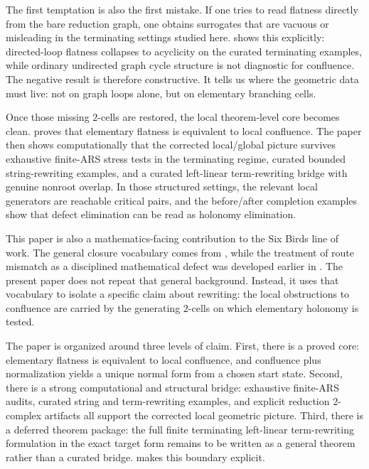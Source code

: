\documentclass[11pt]{article}
\numberwithin{equation}{section}
\theoremstyle{definition}
\theoremstyle{remark}
\begin{document}
The first temptation is also the first mistake. If one tries to read flatness directly from the bare reduction graph, one obtains surrogates that are vacuous or misleading in the terminating settings studied here.  shows this explicitly: directed-loop flatness collapses to acyclicity on the curated terminating examples, while ordinary undirected graph cycle structure is not diagnostic for confluence. The negative result is therefore constructive. It tells us where the geometric data must live: not on graph loops alone, but on elementary branching cells.

Once those missing $2$-cells are restored, the local theorem-level core becomes clean.  proves that elementary flatness is equivalent to local confluence. The paper then shows computationally that the corrected local/global picture survives exhaustive finite-ARS stress tests in the terminating regime, curated bounded string-rewriting examples, and a curated left-linear term-rewriting bridge with genuine nonroot overlap. In those structured settings, the relevant local generators are reachable critical pairs, and the before/after completion examples show that defect elimination can be read as holonomy elimination.

This paper is also a mathematics-facing contribution to the Six Birds line of work. The general closure vocabulary comes from \cite{Tsiokos2026SixBirdsFoundations}, while the treatment of route mismatch as a disciplined mathematical defect was developed earlier in \cite{Tsiokos2026CountStone}. The present paper does not repeat that general background. Instead, it uses that vocabulary to isolate a specific claim about rewriting: the local obstructions to confluence are carried by the generating $2$-cells on which elementary holonomy is tested.

The paper is organized around three levels of claim. First, there is a proved core: elementary flatness is equivalent to local confluence, and confluence plus normalization yields a unique normal form from a chosen start state. Second, there is a strong computational and structural bridge: exhaustive finite-ARS audits, curated string and term-rewriting examples, and explicit reduction 2-complex artifacts all support the corrected local geometric picture. Third, there is a deferred theorem package: the full finite terminating left-linear term-rewriting formulation in the exact target form remains to be written as a general theorem rather than a curated bridge.  makes this boundary explicit.
\end{document}
